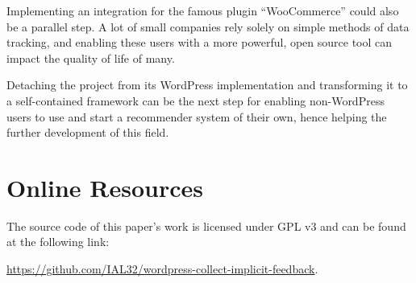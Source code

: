 \documentclass[sigconf,nonacm]{acmart}
\begin{document}
Implementing an integration for the famous plugin ``WooCommerce'' could also be
a parallel step. A lot of small companies rely solely on simple methods of data
tracking, and enabling these users with a more powerful, open source tool can
impact the quality of life of many.

Detaching the project from its WordPress implementation and transforming it to a
self-contained framework can be the next step for enabling non-WordPress users to use and start
a recommender system of their own, hence helping the further development of this field.




\appendix

\section{Online Resources}
The source code of this paper's work is licensed under GPL v3 and can be found at
the following link:

\href{https://github.com/IAL32/wordpress-collect-implicit-feedback}{https://github.com/IAL32/wordpress-collect-implicit-feedback}.
\end{document}
